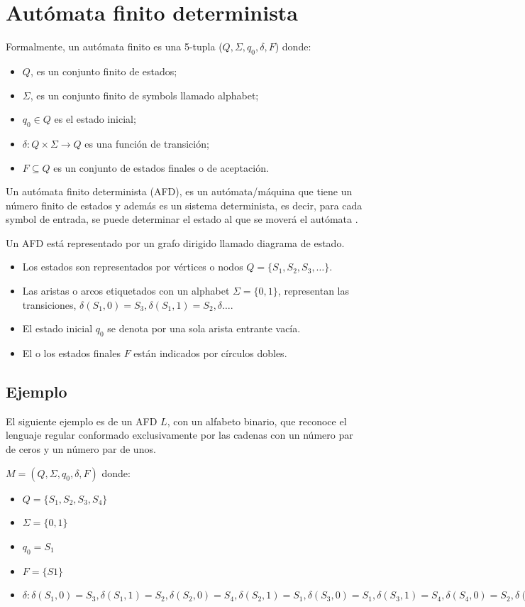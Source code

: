 \section{Autómata finito determinista}\label{FiniteAutomaton}
Formalmente, un autómata finito es una 5-tupla ($Q, \Sigma, q_{0}, \delta, F$) donde:

\begin{itemize}
	\item $Q$, es un conjunto finito de estados;
	\item $\Sigma$, es un conjunto finito de \glspl{symbol} llamado \gls{alphabet};
	\item $q_{0}\in Q$ es el estado inicial;
	\item $\delta \colon Q\times \Sigma \to Q$ es una función de transición;
	\item $F\subseteq Q$ es un conjunto de estados finales o de aceptación.
\end{itemize}

Un autómata finito determinista (AFD), es un autómata/máquina que tiene un número finito de estados y además es un sistema determinista, es decir, para cada \gls{symbol} de entrada, se puede determinar el estado al que se moverá el autómata \cite{wiki:Automata_finito}. 

Un AFD está representado por un grafo dirigido llamado diagrama de estado.

\begin{itemize}
	\item Los estados son representados por vértices o nodos $Q = \{ S_1, S_2, S_3, \dots \}$.
	\item Las aristas o arcos etiquetados con un \gls{alphabet} $\Sigma = \{ 0, 1 \}$, representan las transiciones, $\delta(S_1,0)=S_3, \delta(S_1,1)=S_2, \delta\dots$.
	\item El estado inicial $q_{0}$ se denota por una sola arista entrante vacía.
	\item El o los estados finales $F$ están indicados por círculos dobles.
\end{itemize}

\subsection{Ejemplo}
El siguiente ejemplo es de un AFD $L$, con un alfabeto binario, que reconoce el lenguaje regular conformado exclusivamente por las cadenas con un número par de ceros y un número par de unos.

$M = (Q, \Sigma, q_{0}, \delta, F)$ donde:
\begin{itemize}
	\item $Q = \{S_1, S_2, S_3, S_4 \}$
	\item $\Sigma = \{ 0, 1 \}$
	\item $q_0 = S_1$
	\item $F = \{ S1 \}$
	\item $\delta:  
			\delta(S_1, 0) = S_3, 
			\delta(S_1, 1) = S_2,
			\delta(S_2, 0) = S_4,
			\delta(S_2, 1) = S_1,
			\delta(S_3, 0) = S_1,
			\delta(S_3, 1) = S_4,
			\delta(S_4, 0) = S_2,
			\delta(S_4, 1) = S_3
		$
\end{itemize}

